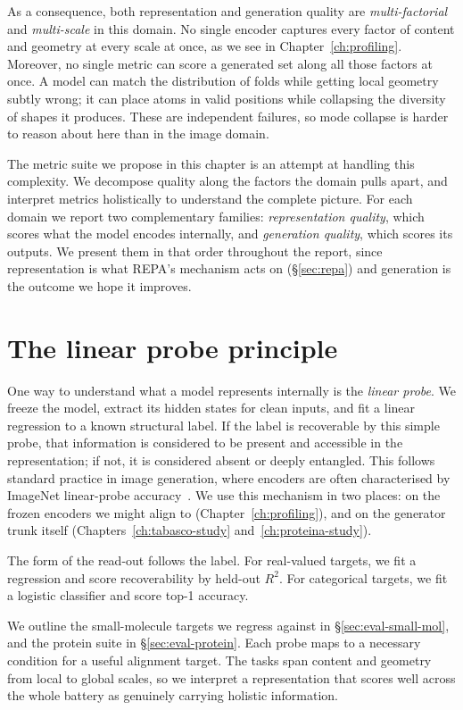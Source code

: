 \documentclass[12pt,a4paper,twoside]{report}
\begin{document}
As a consequence, both representation and generation quality are \emph{multi-factorial} and \emph{multi-scale} in this domain. No single encoder captures every factor of content and geometry at every scale at once, as we see in Chapter~\ref{ch:profiling}. Moreover, no single metric can score a generated set along all those factors at once. A model can match the distribution of folds while getting local geometry subtly wrong; it can place atoms in valid positions while collapsing the diversity of shapes it produces. These are independent failures, so mode collapse is harder to reason about here than in the image domain.

The metric suite we propose in this chapter is an attempt at handling this complexity. We decompose quality along the factors the domain pulls apart, and interpret metrics holistically to understand the complete picture. For each domain we report two complementary families: \emph{representation quality}, which scores what the model encodes internally, and \emph{generation quality}, which scores its outputs. We present them in that order throughout the report, since representation is what REPA's mechanism acts on (\S\ref{sec:repa}) and generation is the outcome we hope it improves.

\section{The linear probe principle}
\label{sec:eval-probe}

One way to understand what a model represents internally is the \emph{linear probe}. We freeze the model, extract its hidden states for clean inputs, and fit a linear regression to a known structural label. If the label is recoverable by this simple probe, that information is considered to be present and accessible in the representation; if not, it is considered absent or deeply entangled. This follows standard practice in image generation, where encoders are often characterised by ImageNet linear-probe accuracy~\cite{REPA}. We use this mechanism in two places: on the frozen encoders we might align to (Chapter~\ref{ch:profiling}), and on the generator trunk itself (Chapters~\ref{ch:tabasco-study} and~\ref{ch:proteina-study}).

The form of the read-out follows the label. For real-valued targets, we fit a regression and score recoverability by held-out $R^2$. For categorical targets, we fit a logistic classifier and score top-1 accuracy.

We outline the small-molecule targets we regress against in \S\ref{sec:eval-small-mol}, and the protein suite in \S\ref{sec:eval-protein}. Each probe maps to a necessary condition for a useful alignment target. The tasks span content and geometry from local to global scales, so we interpret a representation that scores well across the whole battery as genuinely carrying holistic information.
\end{document}
